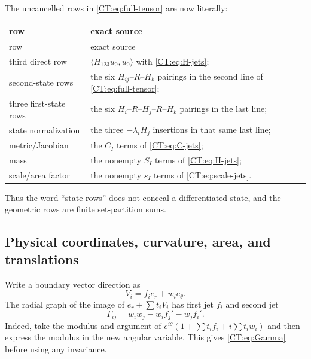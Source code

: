 The uncancelled rows in \eqref{CT:eq:full-tensor} are now literally:
\begin{center}
\begin{longtable}{>{\raggedright\arraybackslash}p{.23\linewidth}
                  >{\raggedright\arraybackslash}p{.66\linewidth}}
\toprule
row & exact source\\
\midrule
\endfirsthead
\toprule
row & exact source\\
\midrule
\endhead
third direct row & $\langle H_{123}u_0,u_0\rangle$ with
\eqref{CT:eq:H-jets};\\
second-state rows & the six $H_{ij}$--$R$--$H_k$ pairings in the second
line of \eqref{CT:eq:full-tensor};\\
three first-state rows & the six $H_i$--$R$--$H_j$--$R$--$H_k$ pairings
in the last line;\\
state normalization & the three $-\lambda_iH_j$ insertions in that same
last line;\\
metric/Jacobian & the $C_I$ terms of \eqref{CT:eq:C-jets};\\
mass & the nonempty $S_I$ terms of \eqref{CT:eq:H-jets};\\
scale/area factor & the nonempty $s_I$ terms of
\eqref{CT:eq:scale-jets}.\\
\bottomrule
\end{longtable}
\end{center}
Thus the word ``state rows'' does not conceal a differentiated state, and
the geometric rows are finite set-partition sums.

\subsection{Physical coordinates, curvature, area, and translations}

Write a boundary vector direction as
\begin{equation}\label{CT:eq:components}
 V_i=f_i e_r+w_i e_\theta.
\end{equation}
The radial graph of the image of
$e_r+\sum t_iV_i$ has first jet $f_i$ and second jet
\begin{equation}\label{CT:eq:Gamma}
 \Gamma_{ij}=w_iw_j-w_if_j'-w_jf_i'.
\end{equation}
Indeed, take the modulus and argument of
$e^{i\theta}(1+\sum t_if_i+i\sum t_iw_i)$ and then express the modulus in
the new angular variable.  This gives \eqref{CT:eq:Gamma} before using any
invariance.

